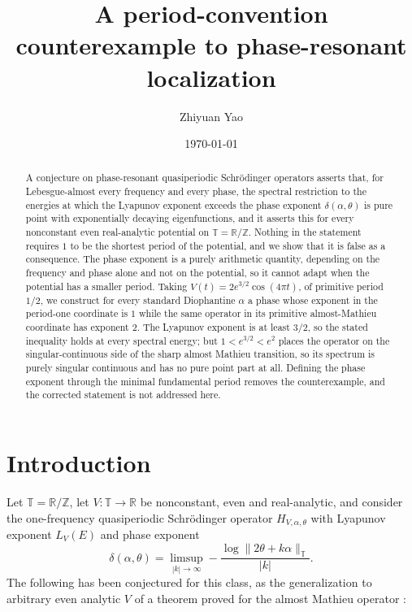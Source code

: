 \documentclass[11pt,reqno]{amsart}
\title[Counterexample to phase-resonant localization]{A period-convention counterexample to phase-resonant\\localization}
\author{Zhiyuan Yao}
\date{\today}
\theoremstyle{plain}
\theoremstyle{definition}
\theoremstyle{remark}
\numberwithin{equation}{section}
\begin{document}
\begin{abstract}
A conjecture on phase-resonant quasiperiodic Schr\"odinger operators asserts
that, for Lebesgue-almost every frequency and every phase, the spectral
restriction to the energies at which the Lyapunov exponent exceeds the phase
exponent $\delta(\alpha,\theta)$ is pure point with exponentially decaying
eigenfunctions, and it asserts this for every nonconstant even real-analytic
potential on $\mathbb T=\mathbb R/\mathbb Z$. Nothing in the statement
requires $1$ to be the shortest period of the potential, and we show that it
is false as a consequence. The phase exponent is a purely arithmetic
quantity, depending on the frequency and phase alone and not on the
potential, so it cannot adapt when the potential has a smaller period. Taking
$V(t)=2e^{3/2}\cos(4\pi t)$, of primitive period $1/2$, we construct for every
standard Diophantine $\alpha$ a phase whose exponent in the period-one
coordinate is $1$ while the same operator in its primitive almost-Mathieu
coordinate has exponent $2$. The Lyapunov exponent is at least $3/2$, so the stated
inequality holds at every spectral energy; but $1<e^{3/2}<e^{2}$ places the
operator on the singular-continuous side of the sharp almost Mathieu
transition, so its spectrum is purely singular continuous and has no pure
point part at all. Defining the phase exponent through the minimal
fundamental period removes the counterexample, and the corrected statement is
not addressed here.
\end{abstract}

\maketitle

\section{Introduction}
\label{sec:intro}

Let $\mathbb T=\mathbb R/\mathbb Z$, let $V:\mathbb T\to\mathbb R$ be
nonconstant, even and real-analytic, and consider the one-frequency
quasiperiodic Schr\"odinger operator $H_{V,\alpha,\theta}$ with Lyapunov
exponent $L_V(E)$ and phase exponent
\begin{equation}
  \label{eq:delta}
  \delta(\alpha,\theta)
  =\limsup_{|k|\to\infty}
   -\frac{\log\lVert2\theta+k\alpha\rVert_{\mathbb T}}{|k|}.
\end{equation}
The following has been conjectured for this class, as the generalization to
arbitrary even analytic $V$ of a theorem proved for the almost Mathieu
operator \cite{Jitomirskaya_2024ur,Jitomirskaya_2023od}:
\end{document}
